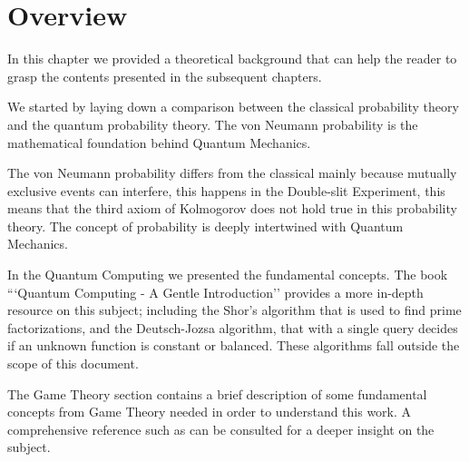 \section{Overview}
\label{sec:background_overview}

In this chapter we provided a theoretical background that can help the reader to grasp the contents presented in the subsequent chapters.

We started by laying down a comparison between the classical probability theory and the quantum probability theory. The von Neumann probability is the mathematical foundation behind Quantum Mechanics. 

The von Neumann probability differs from the classical mainly because mutually exclusive events can interfere, this happens in the Double-slit Experiment, this means that the third axiom of Kolmogorov does not hold true in this probability theory. The concept of probability is deeply intertwined with Quantum Mechanics. 

In the Quantum Computing we presented the fundamental concepts. The book ```Quantum Computing - A Gentle Introduction''\cite{Rieffel2011} provides a more in-depth resource on this subject; including the Shor's algorithm that is used to find prime factorizations, and the Deutsch-Jozsa algorithm, that with a single query decides if an unknown function is constant or balanced. These algorithms fall outside the scope of this document.

The Game Theory section contains a brief description of some fundamental concepts from Game Theory needed in order to understand this work. A comprehensive reference such as \cite{Osborne2004} can be consulted for a deeper insight on the subject.


